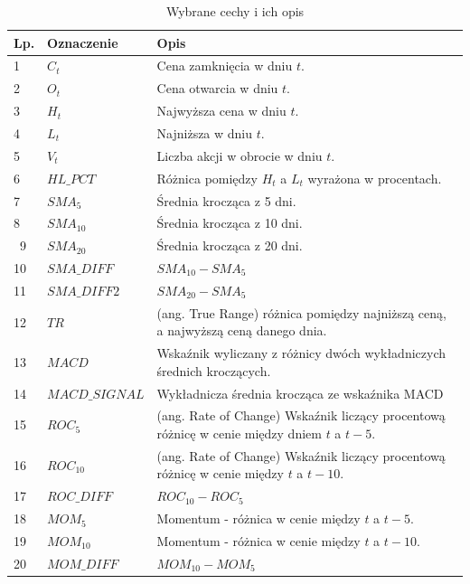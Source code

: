 \documentclass[a4paper, twoside, 11pt, openright]{article}
\begin{document}
\begin{longtable}[c]{| m{0.5cm} m{5cm} m{10cm}|} 

\toprule
  Lp. & Oznaczenie & Opis\\
\midrule
\endhead
\midrule

\caption{Wybrane cechy i ich opis}
\label{tab:data_columns_table}
\endfoot



\bottomrule
\caption{Wybrane cechy i ich opis}
\label{tab:data_columns_table}
\endlastfoot


 1 & $C_t$ & Cena zamknięcia w dniu $t$. \\ 
 2 & $O_t$ & Cena otwarcia w dniu $t$. \\
 3 & $H_t$ & Najwyższa cena w dniu $t$. \\
 4 & $L_t$ & Najniższa w dniu $t$. \\
 5 & $V_t$ & Liczba akcji w obrocie w dniu $t$. \\
 6 & $HL\_PCT$ & Różnica pomiędzy $H_t$ a $L_t$ wyrażona w procentach.\\
 7 & $SMA_5$ & Średnia krocząca z 5 dni. \\
 8 & $SMA_{10}$ & Średnia krocząca z 10 dni. \\\
  9 & $SMA_{20}$ & Średnia krocząca z 20 dni. \\
 10 & $SMA\_DIFF$ & $SMA_{10}-SMA_{5}$ \\
 11 & $SMA\_DIFF2$ & $SMA_{20}-SMA_{5}$ \\
 12 & $TR$ & (ang. True Range) różnica pomiędzy najniższą ceną, a najwyższą ceną danego dnia. \\
 13 & $MACD$ & Wskaźnik wyliczany z różnicy dwóch wykładniczych średnich kroczących.\\
 14 & $MACD\_SIGNAL$ & Wykładnicza średnia krocząca ze wskaźnika MACD \\
 15 & $ROC_{5}$ & (ang. Rate of Change) Wskaźnik liczący procentową różnicę w cenie między dniem $t$ a $t-5$. \\
 16 & $ROC_{10}$ & (ang. Rate of Change) Wskaźnik liczący procentową różnicę w cenie między $t$ a $t-10$. \\
 17 & $ROC\_DIFF$ & $ROC_{10}-ROC_{5}$ \\
  18 & $MOM_{5}$ & Momentum - różnica w cenie między $t$ a $t-5$.  \\
 19 & $MOM_{10}$ & Momentum - różnica w cenie między $t$ a $t-10$. \\
 20 & $MOM\_DIFF$ & $MOM_{10}-MOM_{5}$ \\

\end{longtable}
\end{document}
